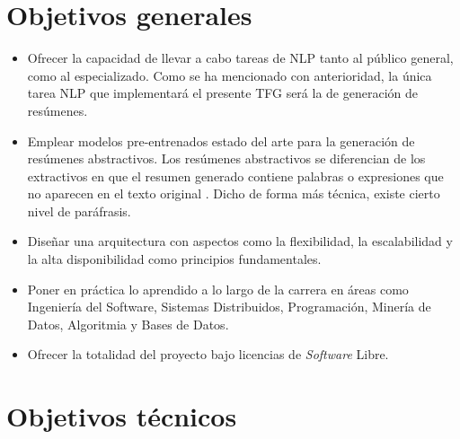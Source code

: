 
\section{Objetivos generales}

\begin{itemize}
	\item [\textbullet] Ofrecer la capacidad de llevar a cabo tareas de NLP tanto al público general, como al especializado. Como se ha mencionado con anterioridad, la única tarea NLP que implementará el presente TFG será la de generación de resúmenes.
	
	\item [\textbullet] Emplear modelos pre-entrenados estado del arte para la generación de resúmenes abstractivos. Los resúmenes abstractivos se diferencian de los extractivos en que el resumen generado contiene palabras o expresiones que no aparecen en el texto original \cite{abigail17}. Dicho de forma más técnica, existe cierto nivel de paráfrasis.
	
	\item [\textbullet] Diseñar una arquitectura con aspectos como la flexibilidad, la escalabilidad y la alta disponibilidad como principios fundamentales.
	
	\item [\textbullet] Poner en práctica lo aprendido a lo largo de la carrera en áreas como Ingeniería del Software, Sistemas Distribuidos, Programación, Minería de Datos, Algoritmia y Bases de Datos.
	
	\item [\textbullet] Ofrecer la totalidad del proyecto bajo licencias de \emph{Software} Libre.
\end{itemize}

\bigskip

\section{Objetivos técnicos}

